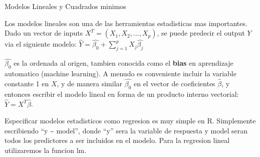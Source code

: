 \documentclass[ignorenonframetext,]{beamer}
\begin{document}
\begin{frame}

\begin{block}{Modelos Lineales y Cuadrados minimos}

Los modelos lineales son una de las herramientas estadisticas mas
importantes. Dado un vector de inputs
\(X^{T}=(X_{1}, X_{2}, ..., X_{p})\), se puede predecir el output \(Y\)
via el siguiente modelo:
\(\hat{Y} = \hat{ \beta_{0} } + \sum_{j=1}^{p} X_{j} \hat{ \beta_{j}}\)

\(\hat{\beta_{0}}\) es la ordenada al origen, tambien conocida como el
\textbf{bias} en aprendizaje automatico (machine learning). A menudo es
conveniente incluir la variable constante 1 en \(X\), y de manera
similar \(\hat{\beta_{0}}\) en el vector de coeficientes
\(\hat{\beta}\), y entonces escribir el modelo lineal en forma de un
producto interno vectorial: \(\hat{Y}=X^{T}\hat{\beta}\).

Especificar modelos estadisticos como regresion es muy simple en R.
Simplemente escribiendo ``y \textasciitilde{} model'', donde ``y'' sera
la variable de respuesta y model seran todos los predictores a ser
incluidos en el modelo. Para la regresion lineal utilizaremos la funcion
lm.

\end{block}

\end{frame}
\end{document}
